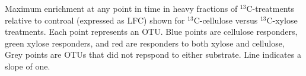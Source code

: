 Maximum enrichment at any point in time in heavy fractions of
$^{13}$C-treatments relative to controal (expressed as LFC) shown for
$^{13}$C-cellulose versus $^{13}$C-xylose treatments. Each point represents an
OTU. Blue points are cellulose responders, green xylose responders, and red are
responders to both xylose and cellulose, Grey points are OTUs that did not
repspond to either substrate. Line indicates a slope of one.
